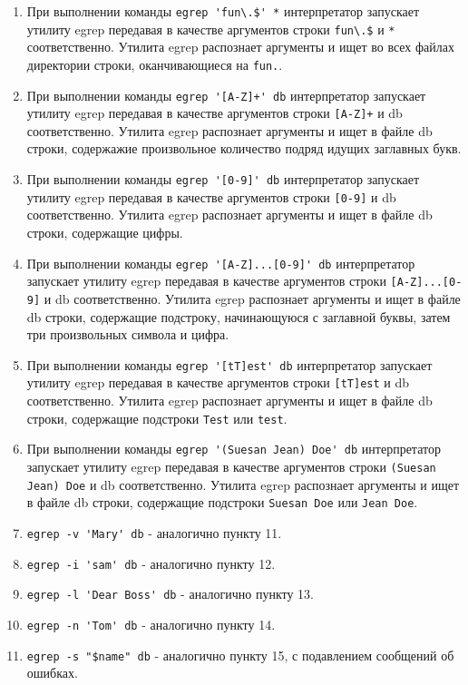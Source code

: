 \documentclass[12pt, a4paper]{article}
\begin{document}
\begin{enumerate}
  \item При выполнении команды \verb|egrep 'fun\.$' *| интерпретатор запускает
    утилиту egrep передавая в качестве аргументов строки \verb|fun\.$| и \verb|*|
    соответственно. Утилита egrep распознает аргументы и ищет во всех файлах директории строки,
    оканчивающиеся на \verb|fun.|.
  \item При выполнении команды \verb|egrep '[A-Z]+' db| интерпретатор запускает
    утилиту egrep передавая в качестве аргументов строки \verb|[A-Z]+| и db
    соответственно. Утилита egrep распознает аргументы и ищет в файле db строки,
    содержажие произвольное количество подряд идущих заглавных букв.
  \item При выполнении команды \verb|egrep '[0-9]' db| интерпретатор запускает
    утилиту egrep передавая в качестве аргументов строки \verb|[0-9]| и db
    соответственно. Утилита egrep распознает аргументы и ищет в файле db строки,
    содержащие цифры.
  \item При выполнении команды \verb|egrep '[A-Z]...[0-9]' db| интерпретатор запускает
    утилиту egrep передавая в качестве аргументов строки \verb|[A-Z]...[0-9]| и db
    соответственно. Утилита egrep распознает аргументы и ищет в файле db строки,
    содержащие подстроку, начинающуюся с заглавной буквы, затем три произвольных
    символа и цифра.
  \item При выполнении команды \verb|egrep '[tT]est' db| интерпретатор запускает
    утилиту egrep передавая в качестве аргументов строки \verb|[tT]est| и db
    соответственно. Утилита egrep распознает аргументы и ищет в файле db строки,
    содержащие подстроки \verb|Test| или \verb|test|.
  \item При выполнении команды \verb|egrep '(Suesan Jean) Doe' db| интерпретатор запускает
    утилиту egrep передавая в качестве аргументов строки \verb|(Suesan Jean) Doe| и db
    соответственно. Утилита egrep распознает аргументы и ищет в файле db строки,
    содержащие подстроки \verb|Suesan Doe| или \verb|Jean Doe|.
  \item \verb|egrep -v 'Mary' db| - аналогично пункту 11.
  \item \verb|egrep -i 'sam' db| - аналогично пункту 12.
  \item \verb|egrep -l 'Dear Boss' db| - аналогично пункту 13.
  \item \verb|egrep -n 'Tom' db| - аналогично пункту 14.
  \item \verb|egrep -s "$name" db| - аналогично пункту 15, с подавлением сообщений
    об ошибках.
\end{enumerate}
\end{document}
